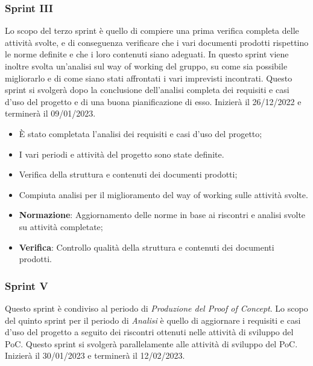 \subsubsection{Sprint III}
Lo scopo del terzo sprint è quello di compiere una prima verifica completa delle attività svolte, e di conseguenza verificare che i vari documenti prodotti rispettino le norme definite e che i loro contenuti siano adeguati. In questo sprint viene inoltre svolta un'analisi sul way of working del gruppo, su come sia possibile migliorarlo e di come siano stati affrontati i vari imprevisti incontrati.
Questo sprint si svolgerà dopo la conclusione dell'analisi completa dei requisiti e casi d'uso del progetto e di una buona pianificazione di esso. Inizierà il 26/12/2022 e terminerà il 09/01/2023.

\:
\begin{itemize}
	\item È stato completata l'analisi dei requisiti e casi d'uso del progetto;
	\item I vari periodi e attività del progetto sono state definite.
\end{itemize}

\:
\begin{itemize}
	\item Verifica della struttura e contenuti dei documenti prodotti;
	\item Compiuta analisi per il miglioramento del way of working sulle attività svolte.
\end{itemize}

\:
\begin{itemize}
	\item \textbf{Normazione}: Aggiornamento delle norme in base ai riscontri e analisi svolte su attività completate;
	\item \textbf{Verifica}: Controllo qualità della struttura e contenuti dei documenti prodotti.
\end{itemize}

\subsubsection{Sprint V}
Questo sprint è condiviso al periodo di \textit{Produzione del Proof of Concept}.
Lo scopo del quinto sprint per il periodo di \textit{Analisi} è quello di aggiornare i requisiti e casi d'uso del progetto a seguito dei riscontri ottenuti nelle attività di sviluppo del PoC.
Questo sprint si svolgerà parallelamente alle attività di sviluppo del PoC. Inizierà il 30/01/2023 e terminerà il 12/02/2023.

